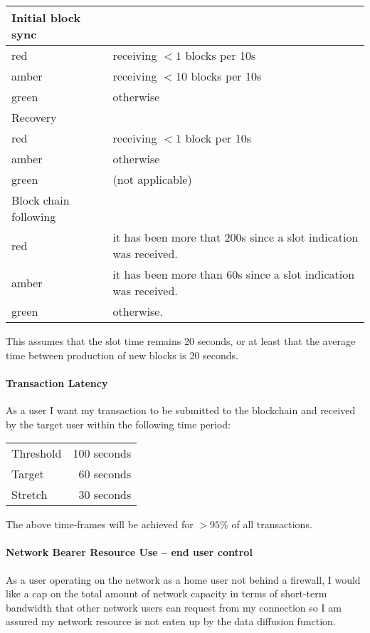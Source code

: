 \documentclass{report}
\theoremstyle{definition}{
  \newtheorem{lemma}{Lemma}[section] %
  \newtheorem{definition}[lemma]{Definition}
}
\theoremstyle{theorem}{
  \newtheorem{invariant}[lemma]{Invariant}
  \newtheorem{proofobligation}[lemma]{Proof Obligation}
}
\numberwithin{equation}{lemma}
\begin{document}
%
\begin{center}
\begin{tabular}{ll}
Initial block sync \\
\hline
red   & receiving $<1$ blocks per 10s \\
amber & receiving $<10$ blocks per 10s \\
green & otherwise  \\[1em]

Recovery \\
\hline
red   & receiving $<1$ block per 10s \\
amber & otherwise  \\
green & (not applicable) \\[1em]

Block chain following \\
\hline
red   & it has been more that 200s since a slot indication was received. \\
amber & it has been more than 60s since a slot indication was received. \\
green & otherwise.
\end{tabular}
\end{center}

This assumes that the slot time remains 20 seconds, or at least that the average time
between production of new blocks is 20 seconds.

\paragraph{Transaction Latency}

As a user I want my transaction to be submitted to the blockchain and received
by the target user within the following time period:
%
\begin{center}
\begin{tabular}{lr}
Threshold & 100 seconds \\
Target    & 60 seconds  \\
Stretch   & 30 seconds  \\
\end{tabular}
\end{center}
%
The above time-frames will be achieved for $>95\%$ of all transactions.

\paragraph{Network Bearer Resource Use -- end user control}

As a user operating on the network as a home user not behind a firewall, I
would like a cap on the total amount of network capacity in terms of short-term
bandwidth that other network users can request from my connection so I am
assured my network resource is not eaten up by the data diffusion function.
\end{document}
